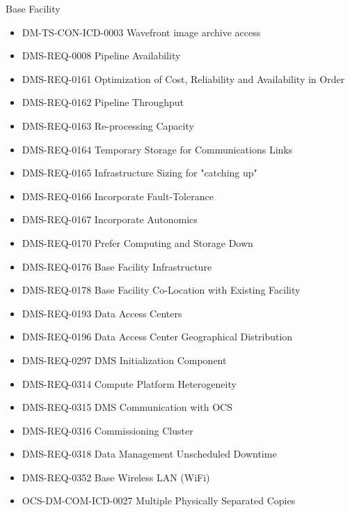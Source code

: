 Base Facility \begin{itemize}
\item DM-TS-CON-ICD-0003 Wavefront image archive access
\item DMS-REQ-0008 Pipeline Availability
\item DMS-REQ-0161 Optimization of Cost, Reliability and Availability in Order
\item DMS-REQ-0162 Pipeline Throughput
\item DMS-REQ-0163 Re-processing Capacity
\item DMS-REQ-0164 Temporary Storage for Communications Links
\item DMS-REQ-0165 Infrastructure Sizing for "catching up"
\item DMS-REQ-0166 Incorporate Fault-Tolerance
\item DMS-REQ-0167 Incorporate Autonomics
\item DMS-REQ-0170 Prefer Computing and Storage Down
\item DMS-REQ-0176 Base Facility Infrastructure
\item DMS-REQ-0178 Base Facility Co-Location with Existing Facility
\item DMS-REQ-0193 Data Access Centers
\item DMS-REQ-0196 Data Access Center Geographical Distribution
\item DMS-REQ-0297 DMS Initialization Component
\item DMS-REQ-0314 Compute Platform Heterogeneity
\item DMS-REQ-0315 DMS Communication with OCS
\item DMS-REQ-0316 Commissioning Cluster
\item DMS-REQ-0318 Data Management Unscheduled Downtime
\item DMS-REQ-0352 Base Wireless LAN (WiFi)
\item OCS-DM-COM-ICD-0027 Multiple Physically Separated Copies
\end{itemize}
